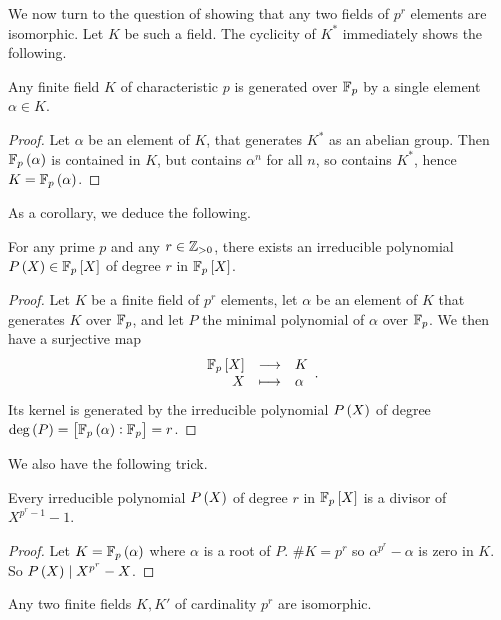 We now turn to the question of showing that any two fields of $ p^r $ elements are isomorphic. Let $ K $ be such a field. The cyclicity of $ K^* $ immediately shows the following.

\begin{proposition}
Any finite field $ K $ of characteristic $ p $ is generated over $ \mathbb{F}_p $ by a single element $ \alpha \in K $.
\end{proposition}

\begin{proof}
Let $ \alpha $ be an element of $ K $, that generates $ K^* $ as an abelian group. Then $ \F_p\br{\alpha} $ is contained in $ K $, but contains $ \alpha^n $ for all $ n $, so contains $ K^* $, hence $ K = \F_p\br{\alpha} $.
\end{proof}

As a corollary, we deduce the following.

\begin{proposition}
For any prime $ p $ and any $ r \in \mathbb{Z}_{> 0} $, there exists an irreducible polynomial $ P\br{X} \in \F_p\sbr{X} $ of degree $ r $ in $ \F_p\sbr{X} $.
\end{proposition}

\begin{proof}
Let $ K $ be a finite field of $ p^r $ elements, let $ \alpha $ be an element of $ K $ that generates $ K $ over $ \mathbb{F}_p $, and let $ P $ the minimal polynomial of $ \alpha $ over $ \mathbb{F}_p $. We then have a surjective map
$$ \function{\F_p\sbr{X}}{K}{X}{\alpha}. $$
Its kernel is generated by the irreducible polynomial $ P\br{X} $ of degree $ \deg\br{P} = \sbr{\F_p\br{\alpha} : \F_p} = r $.
\end{proof}

We also have the following trick.

\begin{lemma}
Every irreducible polynomial $ P\br{X} $ of degree $ r $ in $ \F_p\sbr{X} $ is a divisor of $ X^{p^r - 1} - 1 $.
\end{lemma}

\begin{proof}
Let $ K = \F_p\br{\alpha} $ where $ \alpha $ is a root of $ P $. $ \#K = p^r $ so $ \alpha^{p^r} - \alpha $ is zero in $ K $. So $ P\br{X} \mid X^{p^r} - X $.
\end{proof}

\begin{corollary}
Any two finite fields $ K, K' $ of cardinality $ p^r $ are isomorphic.
\end{corollary}

